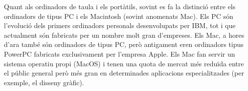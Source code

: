 Quant als ordinadors de taula i els portàtils, sovint es fa la
distinció entre els ordinadors de tipus PC i els Macintosh (sovint
anomenats Mac). Els PC són l'evolució dels primers ordinadors
personals desenvolupats per IBM, tot i que actualment són fabricats
per un nombre molt gran d'empreses. Els Mac, a hores d'ara també són
ordinadors de tipus PC, però antigament eren ordinadors tipus PowerPC
fabricats exclusivament per l'empresa Apple. Els Mac fan servir un
sistema operatiu propi (MacOS) i tenen una quota de mercat més reduïda
entre el públic general però més gran en determinades aplicacions
especialitzades (per exemple, el disseny gràfic).



